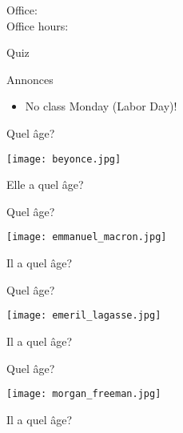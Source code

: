 \documentclass{beamer}
\subtitle[Nombres et adjectifs]{Les nombres et les adjectifs}
\begin{document}
  \begin{frame}
    \titlepage
    \tiny{Office: \\
          Office hours: }
  \end{frame}

  \begin{frame}{}
    \begin{center}
      \Large Quiz
    \end{center}
  \end{frame}

  \begin{frame}{Annonces}
    \begin{itemize}
      \item No class Monday (Labor Day)!
    \end{itemize}
  \end{frame}

  \begin{frame}{Quel âge?}
    \begin{center}
      \texttt{[image: beyonce.jpg]}

      Elle a quel âge? \underline{}
    \end{center}
  \end{frame}

  \begin{frame}{Quel âge?}
    \begin{center}
      \texttt{[image: emmanuel\_macron.jpg]}

      Il a quel âge? \underline{}
    \end{center}
  \end{frame}

  \begin{frame}{Quel âge?}
    \begin{center}
      \texttt{[image: emeril\_lagasse.jpg]}

      Il a quel âge? \underline{}
    \end{center}
  \end{frame}

  \begin{frame}{Quel âge?}
    \begin{center}
      \texttt{[image: morgan\_freeman.jpg]}

      Il a quel âge? \underline{}
    \end{center}
  \end{frame}
\end{document}
